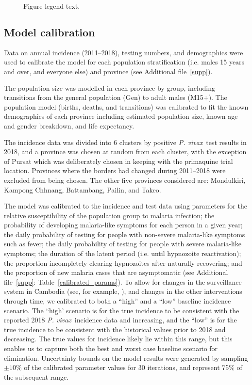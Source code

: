 \documentclass[doublespacing]{bmcart}
\newcommand{\pv}{\textit{P. vivax}}
\begin{document}
\begin{figure}[h!]
  \caption{
  Figure legend text.}
\end{figure}

\subsection*{Model calibration} \label{sec:calibration} %

Data on annual incidence (2011--2018), testing numbers, and demographics were used to calibrate the model for each population stratification (i.e. males 15 years and over, and everyone else) and province (see Additional file~\ref{supp}). 

The population size was modelled in each province by group, including transitions from the general population (Gen) to adult males (M15+). The population model (births, deaths, and transitions) was calibrated to fit the known demographics of each province including estimated population size, known age and gender breakdown, and life expectancy.

The incidence data was divided into 6 clusters by positive \pv~test results in 2018, and a province was chosen at random from each cluster, with the exception of Pursat which was deliberately chosen in keeping with the primaquine trial location. Provinces where the borders had changed during 2011--2018 were excluded from being chosen. The other five provinces considered are: Mondulkiri, Kampong Chhnang, Battambang, Pailin, and Takeo. 

The model was calibrated to the incidence and test data using parameters for the relative susceptibility of the population group to malaria infection; the probability of developing malaria-like symptoms for each person in a given year; the daily probability of testing for people with non-severe malaria-like symptoms such as fever; the daily probability of testing for people with severe malaria-like symptoms; the duration of the latent period (i.e. until hypnozoite reactivation); the proportion incompletely clearing hypnozoites after naturally recovering; and the proportion of new malaria cases that are asymptomatic (see Additional file~\ref{supp}: Table~\ref{calibrated_params}). To allow for changes in the surveillance system in Cambodia (see, for example, \cite{Pengby}), and changes in the other interventions through time, we calibrated to both a ``high'' and a ``low'' baseline incidence scenario. The ``high' scenario is for the true incidence to be consistent with the reported 2018 \pv~incidence data and increasing, and the ``low'' is for the true incidence to be consistent with the historical values prior to 2018 and decreasing. The true values for incidence likely lie within this range, but this enables us to capture both the best and worst case baseline scenario for elimination. Uncertainty bounds on the model results were generated by sampling $\pm10\%$ of the calibrated parameter values for 30 iterations, and represent 75\% of the subsequent range.
\end{document}
